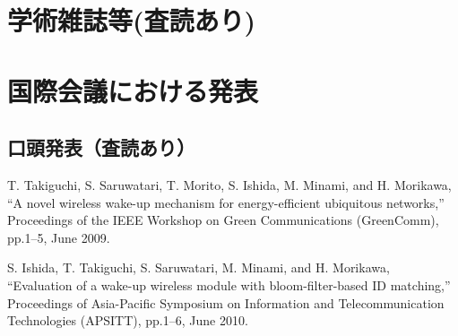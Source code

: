 \publications


\section*{学術雑誌等(査読あり) }


\section*{国際会議における発表}
\subsection*{口頭発表（査読あり）}
\begin{publication}{99}
T. Takiguchi, S. Saruwatari, T. Morito, S. Ishida, M. Minami, and H. Morikawa,
``A novel wireless wake-up mechanism for energy-efficient ubiquitous
  networks,''
Proceedings of the {IEEE} Workshop on Green Communications (GreenComm),
pp.1--5, June 2009.

S. Ishida, T. Takiguchi, S. Saruwatari, M. Minami, and H. Morikawa,
``Evaluation of a wake-up wireless module with bloom-filter-based {ID}
  matching,''
Proceedings of Asia-Pacific Symposium on Information and Telecommunication
  Technologies (APSITT),
pp.1--6, June 2010.

\end{publication}

